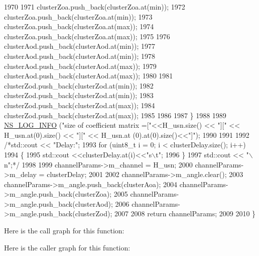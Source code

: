 \begin{DoxyCode}
1970 
1971                 clusterZoa.push\_back(clusterZoa.at(min));
1972                 clusterZoa.push\_back(clusterZoa.at(min));
1973                 clusterZoa.push\_back(clusterZoa.at(max));
1974                 clusterZoa.push\_back(clusterZoa.at(max));
1975 
1976                 clusterAod.push\_back(clusterAod.at(min));
1977                 clusterAod.push\_back(clusterAod.at(min));
1978                 clusterAod.push\_back(clusterAod.at(max));
1979                 clusterAod.push\_back(clusterAod.at(max));
1980 
1981                 clusterZod.push\_back(clusterZod.at(min));
1982                 clusterZod.push\_back(clusterZod.at(min));
1983                 clusterZod.push\_back(clusterZod.at(max));
1984                 clusterZod.push\_back(clusterZod.at(max));
1985 
1986 
1987         \}
1988 
1989         \hyperlink{group__logging_gafbd73ee2cf9f26b319f49086d8e860fb}{NS\_LOG\_INFO} (\textcolor{stringliteral}{"size of coefficient matrix =["}<<H\_usn.size() << \textcolor{stringliteral}{"]["} << H\_usn.at(0).size()
       << \textcolor{stringliteral}{"]["} << H\_usn.at (0).at(0).size()<<\textcolor{stringliteral}{"]"});
1990 
1991 
1992         \textcolor{comment}{/*std::cout << "Delay:";}
1993 \textcolor{comment}{        for (uint8\_t i = 0; i < clusterDelay.size(); i++)}
1994 \textcolor{comment}{        \{}
1995 \textcolor{comment}{                std::cout <<clusterDelay.at(i)<<"s\(\backslash\)t";}
1996 \textcolor{comment}{        \}}
1997 \textcolor{comment}{        std::cout << "\(\backslash\)n";*/}
1998 
1999         channelParams->m\_channel = H\_usn;
2000         channelParams->m\_delay = clusterDelay;
2001 
2002         channelParams->m\_angle.clear();
2003         channelParams->m\_angle.push\_back(clusterAoa);
2004         channelParams->m\_angle.push\_back(clusterZoa);
2005         channelParams->m\_angle.push\_back(clusterAod);
2006         channelParams->m\_angle.push\_back(clusterZod);
2007 
2008         \textcolor{keywordflow}{return} channelParams;
2009 
2010 \}
\end{DoxyCode}


Here is the call graph for this function\+:




Here is the caller graph for this function\+:


